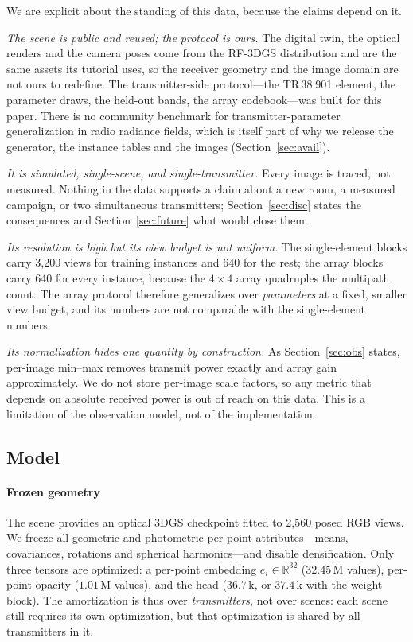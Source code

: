 \documentclass[conference]{IEEEtran}
\begin{document}
We are explicit about the standing of this data, because the claims depend on
it.

\emph{The scene is public and reused; the protocol is ours.} The digital twin,
the optical renders and the camera poses come from the RF-3DGS distribution and
are the same assets its tutorial uses, so the receiver geometry and the image
domain are not ours to redefine. The transmitter-side protocol---the
TR\,38.901 element, the parameter draws, the held-out bands, the array
codebook---was built for this paper. There is no community benchmark for
transmitter-parameter generalization in radio radiance fields, which is itself
part of why we release the generator, the instance tables and the images
(Section~\ref{sec:avail}).

\emph{It is simulated, single-scene, and single-transmitter.} Every image is
traced, not measured. Nothing in the data supports a claim about a new room, a
measured campaign, or two simultaneous transmitters; Section~\ref{sec:disc}
states the consequences and Section~\ref{sec:future} what would close them.

\emph{Its resolution is high but its view budget is not uniform.} The
single-element blocks carry 3{,}200 views for training instances and 640 for the
rest; the array blocks carry 640 for every instance, because the $4\times4$
array quadruples the multipath count. The array protocol therefore generalizes
over \emph{parameters} at a fixed, smaller view budget, and its numbers are not
comparable with the single-element numbers.

\emph{Its normalization hides one quantity by construction.} As
Section~\ref{sec:obs} states, per-image min--max removes transmit power exactly
and array gain approximately. We do not store per-image scale factors, so any
metric that depends on absolute received power is out of reach on this data.
This is a limitation of the observation model, not of the implementation.

\subsection{Model}
\label{sec:arch}

\paragraph{Frozen geometry}
The scene provides an optical 3DGS checkpoint fitted to 2{,}560 posed RGB
views. We freeze all geometric and photometric per-point attributes---means,
covariances, rotations and spherical harmonics---and disable densification.
Only three tensors are optimized: a per-point embedding
$e_i\in\mathbb{R}^{32}$ ($32.45$\,M values), per-point opacity
($1.01$\,M values), and the head ($36.7$\,k, or $37.4$\,k with the weight
block). The amortization is thus over \emph{transmitters}, not over scenes:
each scene still requires its own optimization, but that optimization is shared
by all transmitters in it.
\end{document}
